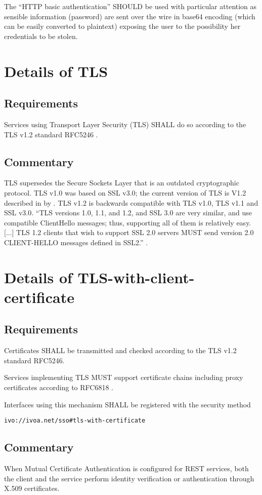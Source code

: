 \documentclass[11pt,a4paper]{ivoa}
\begin{document}
The ``HTTP basic authentication'' SHOULD be used with particular attention as sensible
information (password) are sent over the wire in base64 encoding (which can be easily converted to plaintext) exposing
the user to the possibility her credentials to be stolen.

\section{Details of TLS}
\subsection{Requirements}
Services using Transport Layer Security (TLS) SHALL do so according to the TLS v1.2 standard RFC5246 \citep{std:RFC5246}.

\subsection{Commentary}
TLS supersedes the Secure Sockets Layer that is an outdated cryptographic protocol.   
TLS v1.0 was based on SSL v3.0; the current version of TLS is V1.2 described in by \citet{std:RFC5246}.  
TLS v1.2 is backwards compatible with TLS v1.0, TLS v1.1 and SSL v3.0. 
``TLS versions 1.0, 1.1, and 1.2, and SSL 3.0 are very similar, and use compatible ClientHello messages; 
thus, supporting all of them is   relatively easy.[...] TLS 1.2 clients that wish to support SSL 2.0 servers MUST 
send  version 2.0 CLIENT-HELLO messages defined in SSL2.'' \citep{std:RFC5246}.

\section{Details of TLS-with-client-certificate}
\subsection{Requirements}
Certificates SHALL be transmitted and checked according to the TLS v1.2 standard RFC5246.

Services implementing TLS MUST support certificate chains including proxy certificates according to RFC6818  \citep{std:RFC6818}.

Interfaces using this mechanism SHALL be  registered with the security method 

\texttt{ivo://ivoa.net/sso\#tls-with-certificate}

\subsection{Commentary}
When Mutual Certificate Authentication is configured for REST services, both the client and the service perform 
identity verification or authentication through X.509 certificates. 
\end{document}

